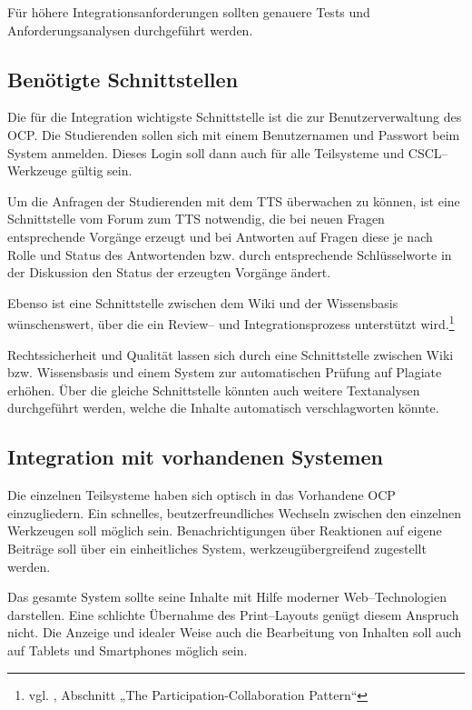 Für höhere Integrationsanforderungen sollten genauere Tests und Anforderungsanalysen durchgeführt werden.

\subsection{Benötigte Schnittstellen} %
\label{sub:benotigte_schnittstellen}
Die für die Integration wichtigste Schnittstelle ist die zur Benutzerverwaltung des \ac{OCP}. Die Studierenden sollen sich mit einem Benutzernamen und Passwort beim System anmelden. Dieses Login soll dann auch für alle Teilsysteme und CSCL–Werkzeuge gültig sein.

Um die Anfragen der Studierenden mit dem \ac{TTS} überwachen zu können, ist eine Schnittstelle vom Forum zum \ac{TTS} notwendig, die bei neuen Fragen entsprechende Vorgänge erzeugt und bei Antworten auf Fragen diese je nach Rolle und Status des Antwortenden bzw. durch entsprechende Schlüsselworte in der Diskussion den Status der erzeugten Vorgänge ändert.

Ebenso ist eine Schnittstelle zwischen dem Wiki und der Wissensbasis wünschenswert, über die ein Review-- und Integrationsprozess unterstützt wird.\footnote{vgl. \cite{governor}, Abschnitt „The Participation-Collaboration Pattern“}

Rechtssicherheit und Qualität lassen sich durch eine Schnittstelle zwischen Wiki bzw. Wissensbasis und einem System zur automatischen Prüfung auf Plagiate erhöhen. Über die gleiche Schnittstelle könnten auch weitere Textanalysen durchgeführt werden, welche die Inhalte automatisch verschlagworten könnte.

\subsection{Integration mit vorhandenen Systemen} %
\label{sub:integration_mit_vorhandenen_systemen}
Die einzelnen Teilsysteme haben sich optisch in das Vorhandene \ac{OCP} einzugliedern. Ein schnelles, beutzerfreundliches Wechseln zwischen den einzelnen Werkzeugen soll möglich sein. Benachrichtigungen über Reaktionen auf eigene Beiträge soll über ein einheitliches System, werkzeugübergreifend zugestellt werden.

Das gesamte System sollte seine Inhalte mit Hilfe moderner Web–Technologien darstellen. Eine schlichte Übernahme des Print–Layouts genügt diesem Anspruch nicht. Die Anzeige und idealer Weise auch die Bearbeitung von Inhalten soll auch auf Tablets und Smartphones möglich sein.
 
